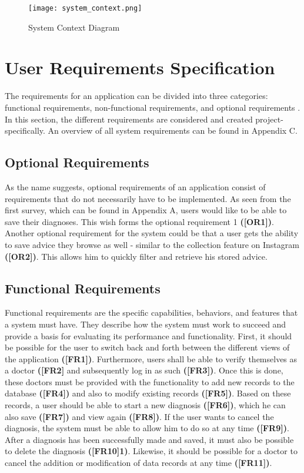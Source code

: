 \begin{figure}[H]
	\centering
	\texttt{[image: system\_context.png]}
	\caption[System Context Diagram ]{System Context Diagram}
\end{figure}

\section{User Requirements Specification}
The requirements for an application can be divided into three categories: functional requirements, non-functional requirements, and optional requirements \cite[p. 51 ff.]{.req2} \cite{.req}. In this section, the different requirements are considered and created project-specifically. An overview of all system requirements can be found in Appendix C.

\subsection{Optional Requirements}
As the name suggests, optional requirements of an application consist of requirements that do not necessarily have to be implemented. As seen from the first survey, which can be found in Appendix A, users would like to be able to save their diagnoses. This wish forms the optional requirement 1  \textbf{([OR1])}. Another optional requirement for the system could be that a user gets the ability to save advice they browse as well - similar to the collection feature on Instagram \textbf{([OR2])}. This allows him to quickly filter and retrieve his stored advice.

\subsection{Functional Requirements}
Functional requirements are the specific capabilities, behaviors, and features that a system must have. They describe how the system must work to succeed and provide a basis for evaluating its performance and functionality. First, it should be possible for the user to switch back and forth between the different views of the application \textbf{([FR1])}. Furthermore, users shall be able to verify themselves as a doctor \textbf{([FR2]} and subsequently log in as such \textbf{([FR3])}. Once this is done, these doctors must be provided with the functionality to add new records to the database \textbf{([FR4])} and also to modify existing records \textbf{([FR5])}. Based on these records, a user should be able to start a new diagnosis \textbf{([FR6])}, which he can also save \textbf{([FR7])} and view again \textbf{([FR8])}. If the user wants to cancel the diagnosis, the system must be able to allow him to do so at any time \textbf{([FR9])}. After a diagnosis has been successfully made and saved, it must also be possible to delete the diagnosis \textbf{([FR10]1)}. Likewise, it should be possible for a doctor to cancel the addition or modification of data records at any time \textbf{([FR11])}. 


